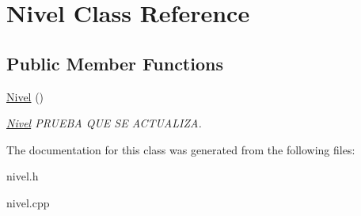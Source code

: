 \hypertarget{classNivel}{\section{Nivel Class Reference}
\label{classNivel}
}
\subsection*{Public Member Functions}
\begin{DoxyCompactItemize}
\item 
\hypertarget{classNivel_a11c4739f354de3ff653af241b837e328}{\hyperlink{classNivel_a11c4739f354de3ff653af241b837e328}{Nivel} ()}\label{classNivel_a11c4739f354de3ff653af241b837e328}

\begin{DoxyCompactList}\small\item\em \hyperlink{classNivel}{Nivel} P\+R\+U\+E\+B\+A Q\+U\+E S\+E A\+C\+T\+U\+A\+L\+I\+Z\+A. \end{DoxyCompactList}\end{DoxyCompactItemize}


The documentation for this class was generated from the following files\+:\begin{DoxyCompactItemize}
\item 
nivel.\+h\item 
nivel.\+cpp\end{DoxyCompactItemize}
